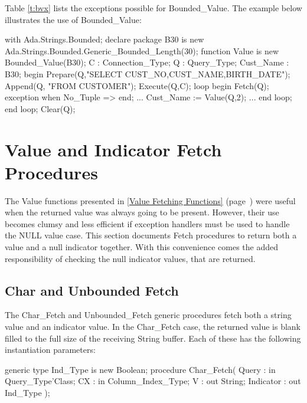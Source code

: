 \documentclass[english,letterpaper]{book}
\newcommand\Ref[1]{\textsection\ref{#1} (page~\pageref{#1})}
\begin{document}
Table \ref{t:bvx} lists the exceptions possible for Bounded\_Value.
The example below illustrates the use of Bounded\_Value:

\begin{Example}
with Ada.Strings.Bounded;
declare
   package B30 is new 
      Ada.Strings.Bounded.Generic_Bounded_Length(30);
   function Value is new Bounded_Value(B30); 
   C :         Connection_Type;
   Q :         Query_Type;
   Cust_Name : B30;
begin
   Prepare(Q,"SELECT CUST_NO,CUST_NAME,BIRTH_DATE");
   Append(Q, "FROM CUSTOMER");
   Execute(Q,C);
   loop
      begin
         Fetch(Q);
      exception
         when No_Tuple =>
      end;
      ...
      Cust_Name := Value(Q,2);
      ...
      end loop;
   end loop;
   Clear(Q);
\end{Example}

\section{Value and Indicator Fetch Procedures\label{Value and Indicator Fetch Procedures}}

The Value functions presented in
\Ref{Value Fetching Functions} were useful when the returned value was
always going to be present. However, their use becomes clumsy and less
efficient if exception handlers must be used to handle the
NULL value case. This section documents Fetch procedures to
return both a value and a null indicator together. With this convenience
comes the added responsibility of checking the null
indicator values, that are returned.


\subsection{Char and Unbounded Fetch}

The Char\_Fetch and Unbounded\_Fetch generic procedures
fetch both a string value and an indicator value. In the Char\_Fetch
case, the returned value is blank filled to the full size of the receiving
String buffer. Each of these has the following instantiation parameters:

\begin{Code}
generic
   type Ind_Type is new Boolean;
procedure Char_Fetch(
   Query :     in     Query_Type'Class;
   CX :        in     Column_Index_Type;
   V :            out String;
   Indicator :    out Ind_Type
);
\end{Code}
\end{document}
